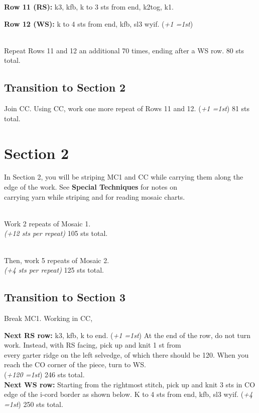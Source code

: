 \documentclass[12pt]{article}
\newcommand{\rowDir}[1]{\textbf{#1:}} %
\newcommand{\increase}[1]{(\emph{+#1 
	\ifnum#1=1{st}\else{sts}\fi})}
\begin{document}
\begin{multicols}{2}
\rowDir{Row 11 (RS)} k3, kfb, k to 3 sts from end, k2tog, k1.

\rowDir{Row 12 (WS)} k to 4 sts from end, kfb, sl3 wyif. \increase{1}

~\\
Repeat Rows 11 and 12 an additional 70 times, ending after a WS row. 80 sts total.


\vfill
\columnbreak

\subsection*{Transition to Section 2}

Join CC. Using CC, work one more repeat of Rows 11 and 12. \increase{1} 81 sts total.

\section*{Section 2}

In Section 2, you will be striping MC1 and CC while carrying them along the edge of the work. See \textbf{Special Techniques} for notes on \\carrying yarn while striping and for reading mosaic charts.

~\\
Work 2 repeats of Mosaic 1. \\ \emph{(+12 sts per repeat)} 105 sts total.

~\\
Then, work 5 repeats of Mosaic 2. \\ \emph{(+4 sts per repeat)} 125 sts total.

\subsection*{Transition to Section 3} 

Break MC1. Working in CC,

\rowDir{Next RS row} k3, kfb, k to end. \increase{1} At the end of the row, do not turn work. Instead, with RS facing, pick up and knit 1 st from \\every garter ridge on the left selvedge, of which there should be 120. When you reach the CO corner of the piece, turn to WS. 
\\ \increase{120} 246 sts total. \\
\rowDir{Next WS row} Starting from the rightmost stitch, pick up and knit 3 sts in CO edge of the i-cord border as shown below. K to 4 sts from end, kfb, sl3 wyif. \increase{4} 250 sts total.


\end{multicols}
\end{document}
